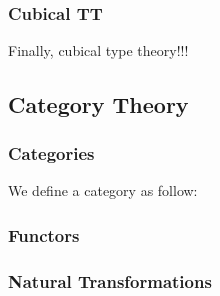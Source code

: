 \begin{code}[hide]%
\>[0]\AgdaSymbol{\{-\#}\AgdaSpace{}%
\AgdaSpace{}%
\AgdaSpace{}%
\AgdaSymbol{\#-\}}\<%
\\
\>[0]\AgdaSpace{}%
\AgdaSpace{}%
\<%
\end{code}

\subsubsection*{Cubical TT}

Finally, cubical type theory!!!

\subsection{Category Theory}

\subsubsection*{Categories}

We define a category as follow:



\subsubsection*{Functors}


\subsubsection*{Natural Transformations}

